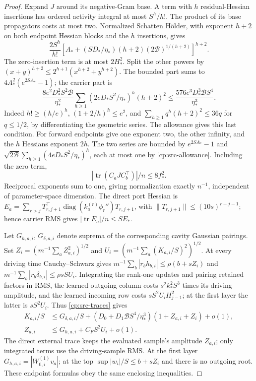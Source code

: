 \begin{proof}
Expand \(J\) around its negative-Gram base.  A term with \(h\)
residual-Hessian insertions has ordered activity integral at most
\(S^h/h!\).  The product of its base propagators costs at most two.
Normalized Schatten H\"older, with exponent \(h+2\) on both
endpoint Hessian blocks and the \(h\) insertions, gives
\[
 \frac{2S^h}{h!}
 [A_*+(SD_*/\eta_*)(h+2)(2\mathcal B)^{1/(h+2)}]^{h+2}.
\]
The zero-insertion term is at most \(2H_*^2\).  Split the other
powers by \((x+y)^{h+2}\le2^{h+1}(x^{h+2}+y^{h+2})\).
The bounded part sums to \(4A_*^2(e^{2SA_*}-1)\); the carrier part is
\[
 \frac{8e^2D_*^2S^2\mathcal B}{\eta_*^2}
 \sum_{h\ge1}(2eD_*S^2/\eta_*)^h(h+2)^2
 \le\frac{576e^3D_*^3\mathcal B S^4}{\eta_*^3}.
\]
Indeed \(h!\ge(h/e)^h\), \((1+2/h)^h\le e^2\), and
\(\sum_{h\ge1}q^h(h+2)^2\le36q\) for \(q\le1/2\), by
differentiating the geometric series.  The allowance gives this last
condition.  For forward endpoints give one exponent two, the other
infinity, and the \(h\) Hessians exponent \(2h\).  The two series
are bounded by \(e^{2SA_*}-1\) and
\(\sqrt{2\mathcal B}\sum_{h\ge1}(4eD_*S^2/\eta_*)^h\),
each at most one by \eqref{cp:src-allowance}.  Including the zero term,
\begin{equation}
 |\operatorname{tr}(C_aJC_b^\top)|/n\le8f_*^2.
 \label{cp:src-forward-trace}
\end{equation}
Reciprocal exponents sum to one, giving normalization exactly
\(n^{-1}\), independent of parameter-space dimension.
The direct port Hessian is
\(E_a=\sum_{r>j}T_{r,j+1}^\top
\operatorname{diag}(k_a^{(r)}\phi_r'')T_{r,j+1}\), with
\(\|T_{r,j+1}\|\le(10s)^{r-j-1}\); hence carrier RMS gives
\(|\operatorname{tr}E_a|/n\le SE_*\).

Let \(G_{h,a,i}\), \(G_{\delta,a,i}\) denote suprema of the
corresponding cavity Gaussian pairings.  Set
\(Z_i=(m^{-1}\sum_aZ_{a,i}^2)^{1/2}\) and
\(U_i=(m^{-1}\sum_a(K_{a,i}/S)^2)^{1/2}\).
At every driving time Cauchy--Schwarz gives
\(m^{-1}\sum_b|r_bh_{b,i}|\le\rho(b+sZ_i)\) and
\(m^{-1}\sum_b|r_b\delta_{b,i}|\le\rho sSU_i\).
Integrating the rank-one updates and pairing retained factors in RMS,
the learned outgoing column costs \(s^2k_*^2S^3\) times its driving
amplitude, and the learned incoming row costs
\(sS^2U_iH_{j-1}^2\); at the first layer the latter is \(sS^2U_i\).
Thus \eqref{cp:src-traces} gives
\begin{align}
 K_{a,i}/S&\le G_{\delta,a,i}/S+
 (D_0+D_1\mathcal BS^4/\eta_*^3)(1+Z_{a,i}+Z_i)+o(1),\nonumber\\
 Z_{a,i}&\le G_{h,a,i}+C_FS^2U_i+o(1).
 \label{cp:src-scalar-feedback}
\end{align}
The direct external trace keeps the evaluated sample's amplitude
\(Z_{a,i}\); only integrated terms use the driving-sample RMS.
At the first layer \(G_{h,a,i}=|W_{0,i}^{(1)}v_a|\); at the top
\(\sup|w_i|/S\le b+sZ_i\) and there is no outgoing root.
These endpoint formulas obey the same enclosing inequalities.


\end{proof}
